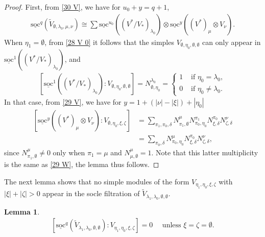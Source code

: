 \documentclass[openany, a4paper]{amsbook}
\newtheorem{lem}[thm]{Lemma}
\theoremstyle{definition}
\numberwithin{equation}{chapter}
\newcommand{\socl}[2]{\underline{\mathrm{soc}}^{#1}({#2})}
\begin{document}
\begin{proof}
    First, from \eqref{30 V}, we have for $u_0 + y = q+1$,
    \begin{align}
        \socl{q}{\tilde{V}_{\emptyset, \lambda_0, \mu, \nu}} \cong \sum  \socl{u_0}{(V^\ast/V_\ast)_{\lambda_0}} \otimes \socl{y}{ (V^*)_\mu \otimes V_\nu}.
    \end{align}
    When $\eta_1 = \emptyset$, from \eqref{28 V 0} it follows that the simples $V_{\emptyset, \eta_0, \emptyset, \emptyset }$ can only appear in $\socl{1}{(V^\ast/V_\ast)_{\lambda_0}}$, and
    \begin{align}
        \left[ \socl{1}{(V^\ast/V_\ast)_{\lambda_0}} \colon V_{\emptyset, \eta_0, \emptyset, \emptyset }  \right] =  N^{\lambda_0}_{\emptyset, \eta_0} = 
        \begin{cases}
            1 & \text{ if } \eta_0=\lambda_0, \\
            0 & \text{ if } \eta_0 \neq \lambda_0.
        \end{cases}
    \end{align}
    In that case, from \eqref{29 V}, we have for $y = 1 + (\left\lvert \nu \right\rvert - \left\lvert \xi \right\rvert ) + \left\lvert \eta_0 \right\rvert $ 
    \begin{align*}
        \left[ \socl{y}{(V^\ast)_\mu \otimes V_\nu } \colon V_{\emptyset, \eta_0, \xi, \zeta }  \right] &= \sum_{\pi_1, \pi_0, \delta} N^{\mu}_{\pi_1, \emptyset} N^{\pi_1}_{\pi_0, \eta_0} N^{\pi_0}_{\xi, \delta} N^{\nu}_{\zeta, \delta}  \\
        & = \sum_{\pi_0, \delta} N^{\mu}_{\pi_0, \eta_0} N^{\pi_0}_{\xi, \delta} N^{\nu}_{\zeta, \delta},
    \end{align*}
    since $N^{\mu}_{\pi_1, \emptyset} \neq 0$ only when $\pi_1 = \mu$ and $N^{\mu}_{\mu, \emptyset} = 1$. Note that this latter multiplicity is the same as \eqref{29 W}, the lemma thus follows. 

    
\end{proof}
The next lemma shows that no simple modules of the form $V_{\eta_1, \eta_0, \xi, \zeta }$ with $ \left\lvert \xi \right\rvert + \left\lvert \zeta \right\rvert > 0$ appear in the socle filtration of $\tilde{V}_{\lambda_1, \lambda_0, \emptyset, \emptyset}$.

\begin{lem}\label{socle 2}
    \begin{align*}
        \left[ \socl{q}{\tilde{V}_{\lambda_1, \lambda_0, \emptyset, \emptyset}} \colon V_{\eta_1, \eta_0, \xi, \zeta } \right] = 0 \quad \text{ unless } \xi = \zeta = \emptyset.
    \end{align*}
\end{lem}
\end{document}
